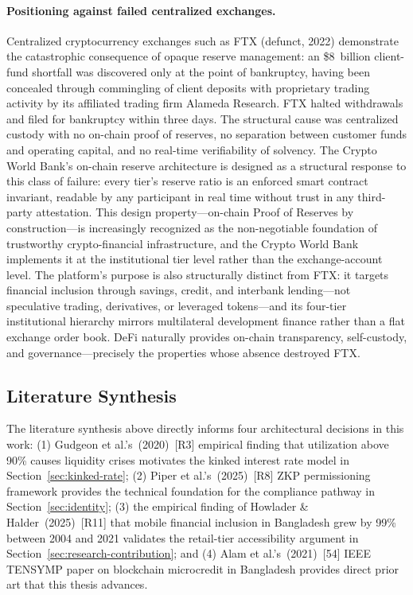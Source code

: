 \documentclass[12pt,a4paper]{report}
\begin{document}
\paragraph{Positioning against failed centralized exchanges.}
Centralized cryptocurrency exchanges such as FTX (defunct, 2022) demonstrate the catastrophic consequence of opaque reserve management: an \$8~billion client-fund shortfall was discovered only at the point of bankruptcy, having been concealed through commingling of client deposits with proprietary trading activity by its affiliated trading firm Alameda Research. FTX halted withdrawals and filed for bankruptcy within three days. The structural cause was centralized custody with no on-chain proof of reserves, no separation between customer funds and operating capital, and no real-time verifiability of solvency. The Crypto World Bank's on-chain reserve architecture is designed as a structural response to this class of failure: every tier's reserve ratio is an enforced smart contract invariant, readable by any participant in real time without trust in any third-party attestation. This design property---on-chain Proof of Reserves by construction---is increasingly recognized as the non-negotiable foundation of trustworthy crypto-financial infrastructure, and the Crypto World Bank implements it at the institutional tier level rather than the exchange-account level. The platform's purpose is also structurally distinct from FTX: it targets financial inclusion through savings, credit, and interbank lending---not speculative trading, derivatives, or leveraged tokens---and its four-tier institutional hierarchy mirrors multilateral development finance rather than a flat exchange order book. DeFi naturally provides on-chain transparency, self-custody, and governance---precisely the properties whose absence destroyed FTX.

\subsection{Literature Synthesis}

The literature synthesis above directly informs four architectural decisions in this work: (1) Gudgeon et al.'s~(2020)~[R3] empirical finding that utilization above 90\% causes liquidity crises motivates the kinked interest rate model in Section~\ref{sec:kinked-rate}; (2) Piper et al.'s~(2025)~[R8] ZKP permissioning framework provides the technical foundation for the compliance pathway in Section~\ref{sec:identity}; (3) the empirical finding of Howlader \& Halder~(2025)~[R11] that mobile financial inclusion in Bangladesh grew by 99\% between 2004 and 2021 validates the retail-tier accessibility argument in Section~\ref{sec:research-contribution}; and (4) Alam et al.'s~(2021)~[54] IEEE TENSYMP paper on blockchain microcredit in Bangladesh provides direct prior art that this thesis advances.
\end{document}

